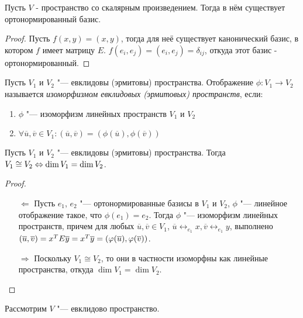 \begin{proposition}
    Пусть $V$ - пространство со скалярным произведением. Тогда в нём существует ортонормированный базис.
\end{proposition}

\begin{proof}
    Пусть $f(x, y) = (x, y)$, тогда для неё существует канонический базис, в котором $f$ имеет 
    матрицу $E$. $f(e_i, e_j) = (e_i, e_j) = \delta_{ij}$, откуда этот базис - ортонормированный.
\end{proof}

\begin{definition}
	Пусть $V_1$ и $V_2$ "--- евклидовы (эрмитовы) пространства. Отображение $\phi: V_1 \rightarrow V_2$ называется \textit{изоморфизмом евклидовых (эрмитовых) пространств}, если:
	\begin{enumerate}
		\item $\phi$ "--- изоморфизм линейных пространств $V_1$ и $V_2$
		\item $\forall \overline{u}, \overline{v} \in V_1: (\overline{u}, \overline{v}) = (\phi(\overline{u}), \phi(\overline{v}))$
	\end{enumerate}
\end{definition}

\begin{theorem}
	Пусть $V_1$ и $V_2$ "--- евклидовы (эрмитовы) пространства. Тогда $V_1 \cong V_2 \hm\lra \dim{V_1} = \dim{V_2}$.
\end{theorem}

\begin{proof}~
	\begin{itemize}
		\item[$\Leftarrow$]Пусть $e_1$, $e_2$ "--- ортонормированные базисы в $V_1$ и $V_2$, $\phi$ "--- линейное отображение такое, что $\phi(e_1) = e_2$. Тогда $\phi$ "--- изоморфизм линейных пространств, причем для любых $\overline{u}, \overline{v} \in V_1$, $\overline{u} \leftrightarrow_{e_1} x, \overline{v} \leftrightarrow_{e_1} y$, выполнено $(\overline{u}, \overline{v}) = x^TE\overline{y} \hm{=} x^T\overline{y} = (\phi(\overline{u}), \phi(\overline{v}))$.
		\item[$\Rightarrow$]Поскольку $V_1 \cong V_2$, то они в частности изоморфны как линейные пространства, откуда $\dim{V_1} = \dim{V_2}$.\qedhere
	\end{itemize}
\end{proof}

Рассмотрим $V$ "--- евклидово пространство.

